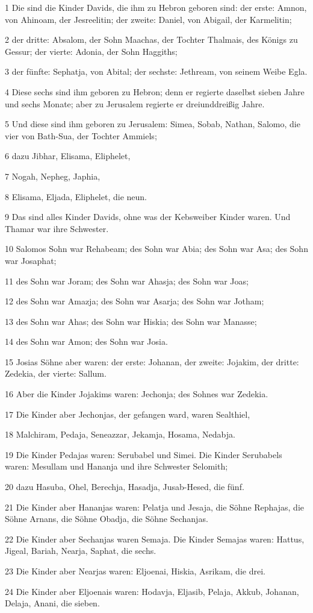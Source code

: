 \par 1 Die sind die Kinder Davids, die ihm zu Hebron geboren sind: der erste: Amnon, von Ahinoam, der Jesreelitin; der zweite: Daniel, von Abigail, der Karmelitin;
\par 2 der dritte: Absalom, der Sohn Maachas, der Tochter Thalmais, des Königs zu Gessur; der vierte: Adonia, der Sohn Haggiths;
\par 3 der fünfte: Sephatja, von Abital; der sechste: Jethream, von seinem Weibe Egla.
\par 4 Diese sechs sind ihm geboren zu Hebron; denn er regierte daselbst sieben Jahre und sechs Monate; aber zu Jerusalem regierte er dreiunddreißig Jahre.
\par 5 Und diese sind ihm geboren zu Jerusalem: Simea, Sobab, Nathan, Salomo, die vier von Bath-Sua, der Tochter Ammiels;
\par 6 dazu Jibhar, Elisama, Eliphelet,
\par 7 Nogah, Nepheg, Japhia,
\par 8 Elisama, Eljada, Eliphelet, die neun.
\par 9 Das sind alles Kinder Davids, ohne was der Kebsweiber Kinder waren. Und Thamar war ihre Schwester.
\par 10 Salomos Sohn war Rehabeam; des Sohn war Abia; des Sohn war Asa; des Sohn war Josaphat;
\par 11 des Sohn war Joram; des Sohn war Ahasja; des Sohn war Joas;
\par 12 des Sohn war Amazja; des Sohn war Asarja; des Sohn war Jotham;
\par 13 des Sohn war Ahas; des Sohn war Hiskia; des Sohn war Manasse;
\par 14 des Sohn war Amon; des Sohn war Josia.
\par 15 Josias Söhne aber waren: der erste: Johanan, der zweite: Jojakim, der dritte: Zedekia, der vierte: Sallum.
\par 16 Aber die Kinder Jojakims waren: Jechonja; des Sohnes war Zedekia.
\par 17 Die Kinder aber Jechonjas, der gefangen ward, waren Sealthiel,
\par 18 Malchiram, Pedaja, Seneazzar, Jekamja, Hosama, Nedabja.
\par 19 Die Kinder Pedajas waren: Serubabel und Simei. Die Kinder Serubabels waren: Mesullam und Hananja und ihre Schwester Selomith;
\par 20 dazu Hasuba, Ohel, Berechja, Hasadja, Jusab-Hesed, die fünf.
\par 21 Die Kinder aber Hananjas waren: Pelatja und Jesaja, die Söhne Rephajas, die Söhne Arnans, die Söhne Obadja, die Söhne Sechanjas.
\par 22 Die Kinder aber Sechanjas waren Semaja. Die Kinder Semajas waren: Hattus, Jigeal, Bariah, Nearja, Saphat, die sechs.
\par 23 Die Kinder aber Nearjas waren: Eljoenai, Hiskia, Asrikam, die drei.
\par 24 Die Kinder aber Eljoenais waren: Hodavja, Eljasib, Pelaja, Akkub, Johanan, Delaja, Anani, die sieben.

